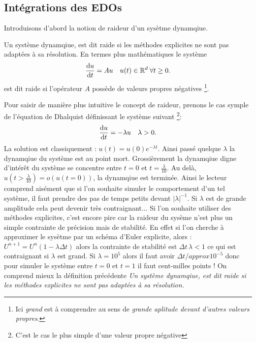 \subsection{Intégrations des EDOs}


Introduisons d'abord la notion de raideur d'un sysètme dynamqiue. 
\begin{definition}
    Un système dynamqiue, est dit raide si les méthodes explicites ne sont pas adaptées à sa résolution.
    En termes plus mathématiques le système 
    \begin{align}
    \frac{\text d u}{\text{d}t} = A u \quad u(t) \in \mathbb{R}^d \: \forall t\geq 0.
    \end{align}
    est dit raide si l'opérateur $A$ possède de  valeurs propres négatives
    \footnote{Ici \textit{grand} est à comprendre au sens de \textit{grande aplitude devant d'autres valeurs propres}.}.
\end{definition}

\begin{exemple}
    Pour saisir de manière plus intuitive le concept de raideur, prenons le cas symple de l'équation de Dhalquist définissant le système suivant
    \footnote{C'est le cas le plus simple d'une valeur propre négative}:
    \begin{align}
        \frac{\text d u }{\text d t} = - \lambda u\quad \lambda > 0.
    \end{align}
    La solution est classiquement : $u(t) = u(0)e^{-\lambda t}$. Ainsi passé quelque $\lambda$ la dynamqiue du système est au point mort. 
    Grossièrement la dynamqiue digne d'intérêt du système se concentre entre $t=0$ et $t=\frac{\lambda}{10}$. Au delà, $u(t>\frac{\lambda}{10}) = o(u(t=0))$, la dynamqiue est terminée.
    Ainsi le lecteur comprend aisément que si l'on souhaite simuler le comportement d'un tel système, il faut prendre des pas de temps petits devant $\vert \lambda \vert^{-1}$.
    Si $\lambda$ est de grande amplitude cela peut devenir très contraignant... Si l'on souhaite utiliser des méthodes explicites, c'est encore pire car la raideur du sysème 
    n'est plus un simple contrainte de précision mais de stabilité. En effet si l'on cherche à approximer le sysètme par un schéma d'Euler explicite, alors : 
    $U^{n+1} = U^n (1 - \lambda \Delta t)$ alors la contrainte de stabilité est $\Delta t \, \lambda < 1$ ce qui est contraignant si $\lambda$ est grand. 
    Si $\lambda = 10^5$ alors il faut avoir $\Delta t /approx 10^{-5}$ donc pour simuler le système entre $t=0$ et $t=1$ il faut cent-milles points !
    On comprend mieux la définition précédente \textit{Un système dynamqiue, est dit raide si les méthodes explicites ne sont pas adaptées à sa résolution.}
\end{exemple}


